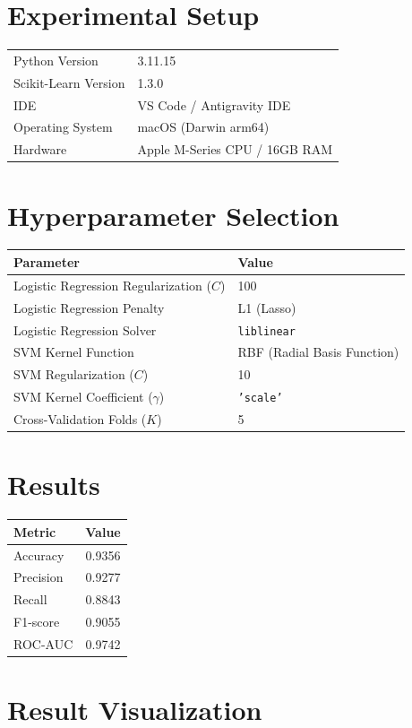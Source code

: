 \documentclass[12pt,a4paper]{article}
\begin{document}
\section{Experimental Setup}
\begin{tabular}{ll}
\toprule
Python Version & 3.11.15 \\
Scikit-Learn Version & 1.3.0 \\
IDE & VS Code / Antigravity IDE \\
Operating System & macOS (Darwin arm64) \\
Hardware & Apple M-Series CPU / 16GB RAM \\
\bottomrule
\end{tabular}

\section{Hyperparameter Selection}

\begin{tabular}{ll}
\toprule
Parameter & Value\\
\midrule
Logistic Regression Regularization ($C$) & 100 \\
Logistic Regression Penalty & L1 (Lasso) \\
Logistic Regression Solver & \texttt{liblinear} \\
SVM Kernel Function & RBF (Radial Basis Function) \\
SVM Regularization ($C$) & 10 \\
SVM Kernel Coefficient ($\gamma$) & \texttt{'scale'} \\
Cross-Validation Folds ($K$) & 5 \\
\bottomrule
\end{tabular}

\section{Results}

\begin{tabular}{lc}
\toprule
Metric & Value\\
\midrule
Accuracy & 0.9356 \\
Precision & 0.9277 \\
Recall & 0.8843 \\
F1-score & 0.9055 \\
ROC-AUC & 0.9742 \\
\bottomrule
\end{tabular}

\section{Result Visualization}
\end{document}

